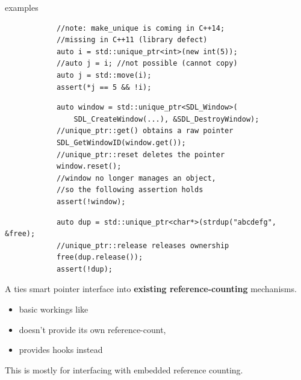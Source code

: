 	\begin{frame}[fragile]{ examples}
		\begin{lstlisting}
			//note: make_unique is coming in C++14;
			//missing in C++11 (library defect)
			auto i = std::unique_ptr<int>(new int(5));
			//auto j = i; //not possible (cannot copy)
			auto j = std::move(i);
			assert(*j == 5 && !i);
		\end{lstlisting}
		
		\pause
		
		\begin{lstlisting}
			auto window = std::unique_ptr<SDL_Window>(
			    SDL_CreateWindow(...), &SDL_DestroyWindow);
			//unique_ptr::get() obtains a raw pointer
			SDL_GetWindowID(window.get());
			//unique_ptr::reset deletes the pointer
			window.reset();
			//window no longer manages an object,
			//so the following assertion holds
			assert(!window);
		\end{lstlisting}
		
		\pause
		
		\begin{lstlisting}
			auto dup = std::unique_ptr<char*>(strdup("abcdefg", &free);
			//unique_ptr::release releases ownership
			free(dup.release());
			assert(!dup);
		\end{lstlisting}
	\end{frame}
	
	\begin{frame}{}
		A  ties smart pointer interface into \textbf{existing reference-counting} mechanisms.
		
		\begin{itemize}
			\item basic workings like 
			\item doesn't provide its own reference-count,
			\item provides hooks instead
		\end{itemize}
		
		\emptyline
		This is mostly for interfacing with embedded reference counting.
		
	\end{frame}
	
